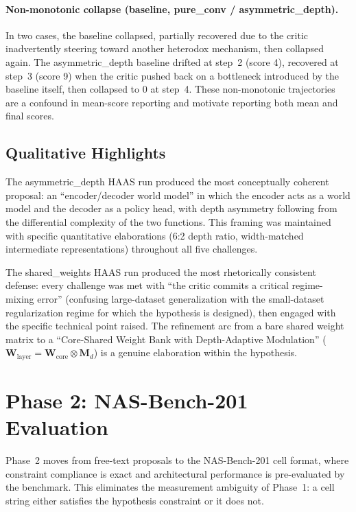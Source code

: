 \documentclass[10pt]{article}
\newcommand{\haas}{\textsc{HAAS}}
\newcommand{\nasbench}{NAS-Bench-201}
\begin{document}
\paragraph{Non-monotonic collapse (baseline, pure\_conv / asymmetric\_depth).}
In two cases, the baseline collapsed, partially recovered due to the critic
inadvertently steering toward another heterodox mechanism, then collapsed again.
The asymmetric\_depth baseline drifted at step~2 (score 4), recovered at step~3
(score 9) when the critic pushed back on a bottleneck introduced by the baseline
itself, then collapsed to 0 at step~4. These non-monotonic trajectories are a
confound in mean-score reporting and motivate reporting both mean and final scores.

\subsection{Qualitative Highlights}
\label{sec:phase1-qualitative}

The asymmetric\_depth \haas{} run produced the most conceptually coherent
proposal: an ``encoder/decoder world model'' in which the encoder acts as a world
model and the decoder as a policy head, with depth asymmetry following from the
differential complexity of the two functions. This framing was maintained with
specific quantitative elaborations (6:2 depth ratio, width-matched intermediate
representations) throughout all five challenges.

The shared\_weights \haas{} run produced the most rhetorically consistent
defense: every challenge was met with ``the critic commits a critical
regime-mixing error'' (confusing large-dataset generalization with the
small-dataset regularization regime for which the hypothesis is designed), then
engaged with the specific technical point raised. The refinement arc from a
bare shared weight matrix to a ``Core-Shared Weight Bank with Depth-Adaptive
Modulation'' ($\mathbf{W}_\text{layer} = \mathbf{W}_\text{core} \otimes
\mathbf{M}_d$) is a genuine elaboration within the hypothesis.

\section{Phase 2: NAS-Bench-201 Evaluation}
\label{sec:phase2}

Phase~2 moves from free-text proposals to the \nasbench{} cell format, where
constraint compliance is exact and architectural performance is pre-evaluated by
the benchmark. This eliminates the measurement ambiguity of Phase~1: a cell
string either satisfies the hypothesis constraint or it does not.
\end{document}
